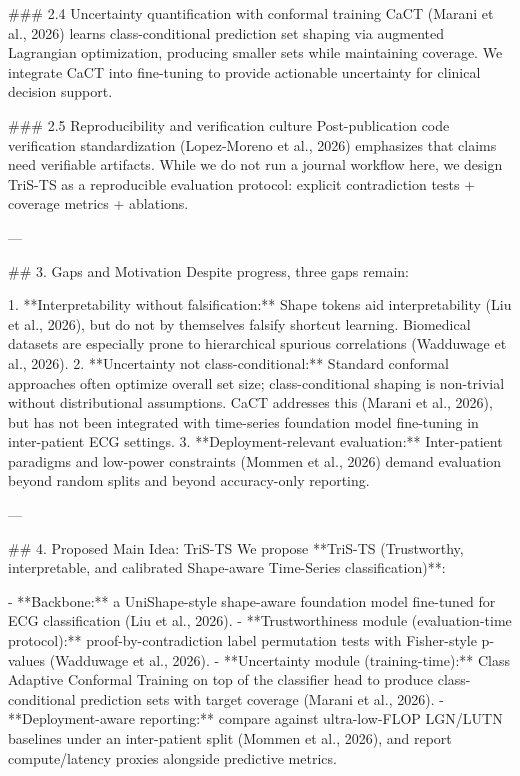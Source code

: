 ### 2.4 Uncertainty quantification with conformal training  
CaCT (Marani et al., 2026) learns class-conditional prediction set shaping via augmented Lagrangian optimization, producing smaller sets while maintaining coverage. We integrate CaCT into fine-tuning to provide actionable uncertainty for clinical decision support.

### 2.5 Reproducibility and verification culture  
Post-publication code verification standardization (Lopez-Moreno et al., 2026) emphasizes that claims need verifiable artifacts. While we do not run a journal workflow here, we design TriS-TS as a reproducible evaluation protocol: explicit contradiction tests + coverage metrics + ablations.

---

## 3. Gaps and Motivation  
Despite progress, three gaps remain:

1. **Interpretability without falsification:** Shape tokens aid interpretability (Liu et al., 2026), but do not by themselves falsify shortcut learning. Biomedical datasets are especially prone to hierarchical spurious correlations (Wadduwage et al., 2026).  
2. **Uncertainty not class-conditional:** Standard conformal approaches often optimize overall set size; class-conditional shaping is non-trivial without distributional assumptions. CaCT addresses this (Marani et al., 2026), but has not been integrated with time-series foundation model fine-tuning in inter-patient ECG settings.  
3. **Deployment-relevant evaluation:** Inter-patient paradigms and low-power constraints (Mommen et al., 2026) demand evaluation beyond random splits and beyond accuracy-only reporting.

---

## 4. Proposed Main Idea: TriS-TS  
We propose **TriS-TS (Trustworthy, interpretable, and calibrated Shape-aware Time-Series classification)**:

- **Backbone:** a UniShape-style shape-aware foundation model fine-tuned for ECG classification (Liu et al., 2026).  
- **Trustworthiness module (evaluation-time protocol):** proof-by-contradiction label permutation tests with Fisher-style p-values (Wadduwage et al., 2026).  
- **Uncertainty module (training-time):** Class Adaptive Conformal Training on top of the classifier head to produce class-conditional prediction sets with target coverage (Marani et al., 2026).  
- **Deployment-aware reporting:** compare against ultra-low-FLOP LGN/LUTN baselines under an inter-patient split (Mommen et al., 2026), and report compute/latency proxies alongside predictive metrics.

